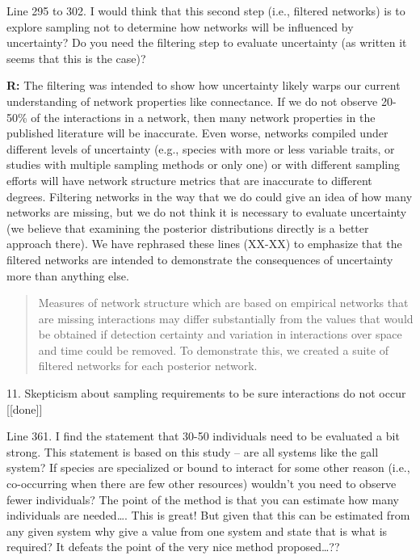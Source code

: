 \documentclass[12pt]{letter}
\newenvironment{refquote}{\bigskip \begin{it}}{\end{it}\smallskip}
\begin{document}
		\begin{refquote}
		Line 295 to 302.  I would think that this second step (i.e., filtered networks) is to explore sampling not to determine how networks will be influenced by uncertainty?  Do you need the filtering step to evaluate uncertainty (as written it seems that this is the case)?
		\end{refquote}

		\textbf{R:} The filtering was intended to show how uncertainty likely warps our current understanding of network properties like connectance. If we do not observe 20-50\% of the interactions in a network, then many network properties in the published literature will be inaccurate. Even worse, networks compiled under different levels of uncertainty (e.g., species with more or less variable traits, or studies with multiple sampling methods or only one) or with different sampling efforts will have network structure metrics that are inaccurate to different degrees. Filtering networks in the way that we do could give an idea of how many networks are missing, but we do not think it is necessary to evaluate uncertainty (we believe that examining the posterior distributions directly is a better approach there). We have rephrased these lines (XX-XX) to emphasize that the filtered networks are intended to demonstrate the consequences of uncertainty more than anything else.

		\begin{quotation}
			Measures of network structure which are based on empirical networks that are missing interactions may differ substantially from the values that would be obtained if detection certainty and variation in interactions over space and time could be removed. To demonstrate this, we created a suite of filtered networks for each posterior network. 
		\end{quotation}


	11. Skepticism about sampling requirements to be sure interactions do not occur [[done]]

		\begin{refquote}
		Line 361.  I find the statement that 30-50 individuals need to be evaluated a bit strong.  This statement is based on this study – are all systems like the gall system?  If species are specialized or bound to interact for some other reason (i.e., co-occurring when there are few other resources) wouldn’t you need to observe fewer individuals?  The point of the method is that you can estimate how many individuals are needed…. This is great!  But given that this can be estimated from any given system why give a value from one system and state that is what is required?  It defeats the point of the very nice method proposed…??
		\end{refquote}
\end{document}
